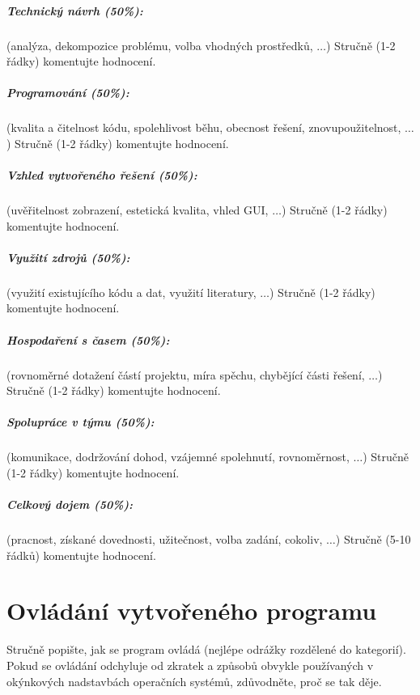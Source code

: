 \documentclass[12pt,a4paper,titlepage,final]{report}
\begin{document}
\paragraph{Technický návrh (50\%):} (analýza, dekompozice problému, volba
vhodných prostředků, $\ldots$) 
Stručně (1-2 řádky) komentujte hodnocení. 

\paragraph{Programování (50\%):} (kvalita a čitelnost kódu, spolehlivost běhu,
obecnost řešení, znovupoužitelnost, $\ldots$)
Stručně (1-2 řádky) komentujte hodnocení. 

\paragraph{Vzhled vytvořeného řešení (50\%):} (uvěřitelnost zobrazení,
estetická kvalita, vhled GUI, $\ldots$)
Stručně (1-2 řádky) komentujte hodnocení. 

\paragraph{Využití zdrojů (50\%):} (využití existujícího kódu a dat, využití
literatury, $\ldots$)
Stručně (1-2 řádky) komentujte hodnocení. 

\paragraph{Hospodaření s časem (50\%):} (rovnoměrné dotažení částí projektu,
míra spěchu, chybějící části řešení, $\ldots$)
Stručně (1-2 řádky) komentujte hodnocení. 

\paragraph{Spolupráce v týmu (50\%):} (komunikace, dodržování dohod, vzájemné
spolehnutí, rovnoměrnost, $\ldots$)
Stručně (1-2 řádky) komentujte hodnocení. 

\paragraph{Celkový dojem (50\%):} (pracnost, získané dovednosti, užitečnost,
volba zadání, cokoliv, $\ldots$)
Stručně (5-10 řádků) komentujte hodnocení. 

\chapter{Ovládání vytvořeného programu}
Stručně popište, jak se program ovládá (nejlépe odrážky rozdělené do
kategorií). Pokud se ovládání odchyluje od zkratek a způsobů obvykle
používaných v okýnkových nadstavbách operačních systémů, zdůvodněte, proč se
tak děje.
\end{document}
